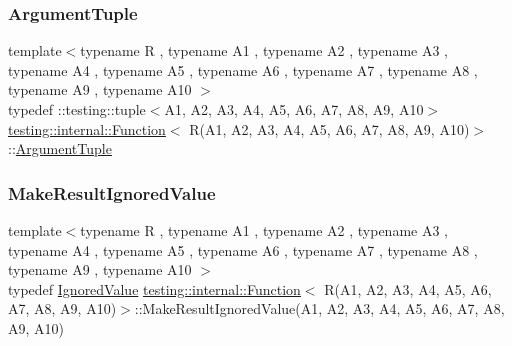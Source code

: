 \mbox{\label{structtesting_1_1internal_1_1_function_3_01_r_07_a1_00_01_a2_00_01_a3_00_01_a4_00_01_a5_00_01_a6f6ff91550f0557b7708e490e5002cd35_a38b8a4911806458eacc69740d4638d87}} 
\subsubsection{\texorpdfstring{ArgumentTuple}{ArgumentTuple}}
{\footnotesize\ttfamily template$<$typename R , typename A1 , typename A2 , typename A3 , typename A4 , typename A5 , typename A6 , typename A7 , typename A8 , typename A9 , typename A10 $>$ \\
typedef \+::testing\+::tuple$<$A1, A2, A3, A4, A5, A6, A7, A8, A9, A10$>$ \mbox{\hyperlink{structtesting_1_1internal_1_1_function}{testing\+::internal\+::\+Function}}$<$ R(A1, A2, A3, A4, A5, A6, A7, A8, A9, A10)$>$\+::\mbox{\hyperlink{structtesting_1_1internal_1_1_function_3_01_r_07_08_4_ad483c3128c470d8cdb55c3ac1c575c11}{Argument\+Tuple}}}

\mbox{\label{structtesting_1_1internal_1_1_function_3_01_r_07_a1_00_01_a2_00_01_a3_00_01_a4_00_01_a5_00_01_a6f6ff91550f0557b7708e490e5002cd35_a4e905802374219aa3e556ccc65191098}} 
\subsubsection{\texorpdfstring{MakeResultIgnoredValue}{MakeResultIgnoredValue}}
{\footnotesize\ttfamily template$<$typename R , typename A1 , typename A2 , typename A3 , typename A4 , typename A5 , typename A6 , typename A7 , typename A8 , typename A9 , typename A10 $>$ \\
typedef \mbox{\hyperlink{classtesting_1_1internal_1_1_ignored_value}{Ignored\+Value}} \mbox{\hyperlink{structtesting_1_1internal_1_1_function}{testing\+::internal\+::\+Function}}$<$ R(A1, A2, A3, A4, A5, A6, A7, A8, A9, A10)$>$\+::Make\+Result\+Ignored\+Value(A1, A2, A3, A4, A5, A6, A7, A8, A9, A10)}


